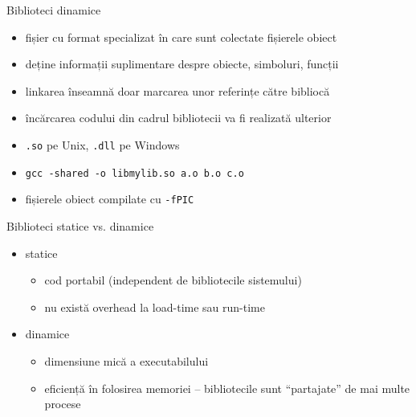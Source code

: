 \documentclass{beamer}
\begin{document}
\begin{frame}{Biblioteci dinamice}
  \begin{itemize}
    \item fișier cu format specializat în care sunt colectate fișierele obiect
    \item deține informații suplimentare despre obiecte, simboluri, funcții
    \item linkarea înseamnă doar marcarea unor referințe către bibliocă
    \item încărcarea codului din cadrul bibliotecii va fi realizată ulterior
    \item \texttt{.so} pe Unix, \texttt{.dll} pe Windows
    \item \texttt{gcc -shared -o libmylib.so a.o b.o c.o}
    \item fișierele obiect compilate cu \texttt{-fPIC}
  \end{itemize}
\end{frame}

\begin{frame}{Biblioteci statice vs. dinamice}
  \begin{itemize}
    \item statice
      \begin{itemize}
        \item cod portabil (independent de bibliotecile sistemului)
        \item nu există overhead la load-time sau run-time
      \end{itemize}
    \item dinamice
      \begin{itemize}
        \item dimensiune mică a executabilului
        \item eficiență în folosirea memoriei -- bibliotecile sunt
        ``partajate'' de mai multe procese
      \end{itemize}
  \end{itemize}
\end{frame}
\end{document}
